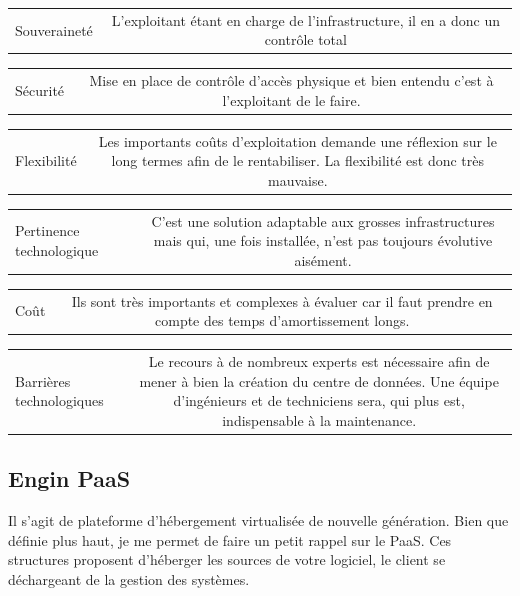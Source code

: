 \documentclass[11pt, a4paper ]{article}
\begin{document}
\begin{spacing}{1.5}
\begin{center}
	\begin{tabular}{| l | c | }
		Souveraineté &  L'exploitant étant en charge de l'infrastructure, il en a donc un contrôle total \\
	\end{tabular}
	\begin{tabular}{| l | c | }
		Sécurité & Mise en place de contrôle d’accès physique et bien entendu c'est à l'exploitant de le faire. \\
	\end{tabular}
	\begin{tabular}{| l | c | }
		Flexibilité & Les importants coûts d'exploitation demande une réflexion sur le long termes afin de le rentabiliser.  La flexibilité est donc très mauvaise.\\
	\end{tabular}
	\begin{tabular}{| l | c | }
		Pertinence technologique & C'est une solution adaptable aux grosses infrastructures mais qui, une fois installée, n'est pas toujours évolutive aisément. \\
	\end{tabular}
	\begin{tabular}{| l | c | }
		Coût & Ils sont très importants et complexes à évaluer car il faut prendre en compte des temps d'amortissement longs.\\
	\end{tabular}
	\begin{tabular}{| l | c | }
		Barrières technologiques & Le recours à de nombreux experts est nécessaire afin de mener à bien la création du centre de données. Une équipe d'ingénieurs et de techniciens sera, qui plus est, indispensable à la maintenance. \\
	\end{tabular}
\end{center}

			\subsection{Engin PaaS}

Il s'agit de plateforme d'hébergement virtualisée de nouvelle génération.  Bien que définie plus haut, je me permet de faire un petit rappel sur le PaaS. Ces structures proposent d'héberger les sources de votre logiciel, le client se déchargeant de la gestion des systèmes.


\end{spacing}
\end{document}
